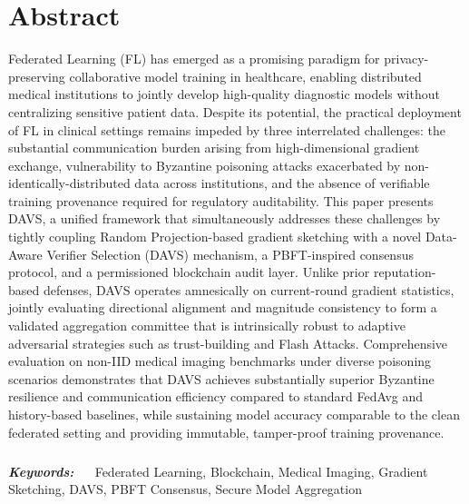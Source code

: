 \chapter*{Abstract}
\sloppy

\vspace{1cm}
\par Federated Learning (FL) has emerged as a promising paradigm for privacy-preserving collaborative model training in healthcare, enabling distributed medical institutions to jointly develop high-quality diagnostic models without centralizing sensitive patient data. Despite its potential, the practical deployment of FL in clinical settings remains impeded by three interrelated challenges: the substantial communication burden arising from high-dimensional gradient exchange, vulnerability to Byzantine poisoning attacks exacerbated by non-identically-distributed data across institutions, and the absence of verifiable training provenance required for regulatory auditability. This paper presents DAVS, a unified framework that simultaneously addresses these challenges by tightly coupling Random Projection-based gradient sketching with a novel Data-Aware Verifier Selection (DAVS) mechanism, a PBFT-inspired consensus protocol, and a permissioned blockchain audit layer. Unlike prior reputation-based defenses, DAVS operates amnesically on current-round gradient statistics, jointly evaluating directional alignment and magnitude consistency to form a validated aggregation committee that is intrinsically robust to adaptive adversarial strategies such as trust-building and Flash Attacks. Comprehensive evaluation on non-IID medical imaging benchmarks under diverse poisoning scenarios demonstrates that DAVS achieves substantially superior Byzantine resilience and communication efficiency compared to standard FedAvg and history-based baselines, while sustaining model accuracy comparable to the clean federated setting and providing immutable, tamper-proof training provenance. 

\paragraph{}





\vspace*{0.7cm}
\noindent
{\large{\textbf{\emph{Keywords:}}}}~
~ Federated Learning, Blockchain, Medical Imaging, Gradient Sketching, DAVS, PBFT Consensus, Secure Model Aggregation





